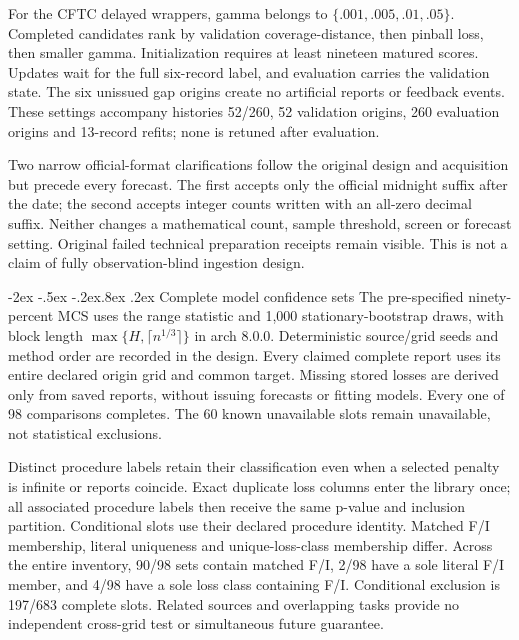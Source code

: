 \documentclass[10pt,a4paper]{article}
\makeatletter
\renewcommand\section{\@startsection{section}{1}{\z@}%
  {-2ex \@plus -.5ex \@minus -.2ex}{.8ex \@plus .2ex}%
  {\normalfont\large\bfseries}}
\makeatother
\begin{document}
For the CFTC delayed wrappers, gamma belongs to $\{.001,.005,.01,.05\}$. Completed candidates rank by validation coverage-distance, then pinball loss, then smaller gamma. Initialization requires at least nineteen matured scores. Updates wait for the full six-record label, and evaluation carries the validation state. The six unissued gap origins create no artificial reports or feedback events. These settings accompany histories 52/260, 52 validation origins, 260 evaluation origins and 13-record refits; none is retuned after evaluation.

Two narrow official-format clarifications follow the original design and acquisition but precede every forecast. The first accepts only the official midnight suffix after the date; the second accepts integer counts written with an all-zero decimal suffix. Neither changes a mathematical count, sample threshold, screen or forecast setting. Original failed technical preparation receipts remain visible. This is not a claim of fully observation-blind ingestion design.

\clearpage
\section{Complete model confidence sets}\label{sup:v10-mcs}
The pre-specified ninety-percent MCS uses the range statistic and 1,000 stationary-bootstrap draws, with block length $\max\{H,\lceil n^{1/3}\rceil\}$ in arch 8.0.0. Deterministic source/grid seeds and method order are recorded in the design. Every claimed complete report uses its entire declared origin grid and common target. Missing stored losses are derived only from saved reports, without issuing forecasts or fitting models. Every one of 98 comparisons completes. The 60 known unavailable slots remain unavailable, not statistical exclusions.

Distinct procedure labels retain their classification even when a selected penalty is infinite or reports coincide. Exact duplicate loss columns enter the library once; all associated procedure labels then receive the same p-value and inclusion partition. Conditional slots use their declared procedure identity. Matched F/I membership, literal uniqueness and unique-loss-class membership differ. Across the entire inventory, 90/98 sets contain matched F/I, 2/98 have a sole literal F/I member, and 4/98 have a sole loss class containing F/I. Conditional exclusion is 197/683 complete slots. Related sources and overlapping tasks provide no independent cross-grid test or simultaneous future guarantee.
\end{document}
